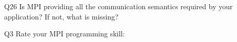 \begin{description}%
\item{Q26} Is MPI providing all the communication semantics required by your application? If not, what is missing?%
\item{Q3} Rate your MPI programming skill:%
\end{description}%
